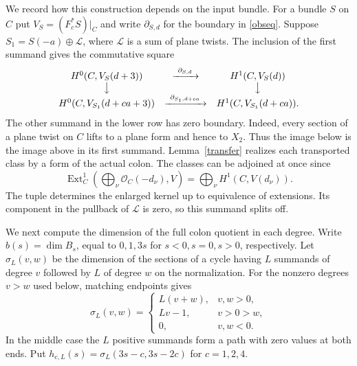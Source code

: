 \documentclass[11pt,a4paper,reqno]{amsart}
\numberwithin{equation}{section}
\theoremstyle{plain}
\newcommand{\OO}{\mathcal O}
\begin{document}
We record how this construction depends on the input bundle. For a bundle $S$ on $C$ put $V_S=(F_c^*S)|_C$ and write $\partial_{S,d}$ for the boundary in \eqref{obseq}. Suppose $S_1=S(-a)\oplus\mathcal L$, where $\mathcal L$ is a sum of plane twists. The inclusion of the first summand gives the commutative square
\begin{equation}\label{eq:transport}
\begin{array}{ccc}
 H^0(C,V_S(d+3)) &\xrightarrow{\ \partial_{S,d}\ }& H^1(C,V_S(d))\\
 \big\downarrow &&\big\downarrow\\
 H^0(C,V_{S_1}(d+ca+3)) &\xrightarrow{\ \partial_{S_1,d+ca}\ }&
 H^1(C,V_{S_1}(d+ca)).
\end{array}
\end{equation}
The other summand in the lower row has zero boundary. Indeed, every section of a plane twist on $C$ lifts to a plane form and hence to $X_2$. Thus the image below is the image above in its first summand. Lemma~\ref{transfer} realizes each transported class by a form of the actual colon. The classes can be adjoined at once since
\[
 \operatorname{Ext}^1_C\!\left(\bigoplus_\nu\OO_C(-d_\nu),V\right)
       =\bigoplus_\nu H^1(C,V(d_\nu)).
\]
The tuple determines the enlarged kernel up to equivalence of extensions. Its component in the pullback of $\mathcal L$ is zero, so this summand splits off.

We next compute the dimension of the full colon quotient in each degree. Write $b(s)=\dim B_s$, equal to $0,1,3s$ for $s<0,s=0,s>0$, respectively. Let $\sigma_L(v,w)$ be the dimension of the sections of a cycle having $L$ summands of degree $v$ followed by $L$ of degree $w$ on the normalization. For the nonzero degrees $v>w$ used below, matching endpoints gives
\begin{equation}\label{sections}
 \sigma_L(v,w)=
 \begin{cases}
 L(v+w),&v,w>0,\\
 Lv-1,&v>0>w,\\
 0,&v,w<0 .
 \end{cases}
\end{equation}
In the middle case the $L$ positive summands form a path with zero values at both ends. Put $h_{c,L}(s)=\sigma_L(3s-c,3s-2c)$ for $c=1,2,4$.
\end{document}
